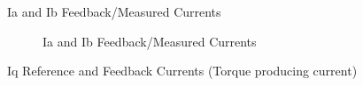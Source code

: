 \begin{frame}{Ia and Ib Feedback/Measured Currents}
	\begin{figure}
		\centering

		\caption{Ia and Ib Feedback/Measured Currents}
	\end{figure}
\end{frame}


\begin{frame}{Iq Reference and Feedback Currents (Torque producing current)}
	\begin{figure}
		\centering


	\end{figure}
\end{frame}

